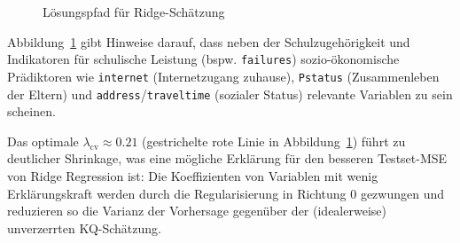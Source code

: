 \documentclass[
  a4paper,
  DIV=11,
  oneside]{scrreprt}
\begin{document}
\begin{figure}[t]


\caption{\label{fig-ridgAppPlot}Lösungspfad für Ridge-Schätzung}

\end{figure}%

Abbildung~\ref{fig-ridgAppPlot} gibt Hinweise darauf, dass neben der
Schulzugehörigkeit und Indikatoren für schulische Leistung (bspw.
\texttt{failures}) sozio-ökonomische Prädiktoren wie \texttt{internet}
(Internetzugang zuhause), \texttt{Pstatus} (Zusammenleben der Eltern)
und \texttt{address}/\texttt{traveltime} (sozialer Status) relevante
Variablen zu sein scheinen.

Das optimale \(\lambda_\mathrm{cv} \approx 0.21\) (gestrichelte rote
Linie in Abbildung~\ref{fig-ridgAppPlot}) führt zu deutlicher Shrinkage,
was eine mögliche Erklärung für den besseren Testset-MSE von Ridge
Regression ist: Die Koeffizienten von Variablen mit wenig
Erklärungskraft werden durch die Regularisierung in Richtung 0 gezwungen
und reduzieren so die Varianz der Vorhersage gegenüber der
(idealerweise) unverzerrten KQ-Schätzung.
\end{document}
